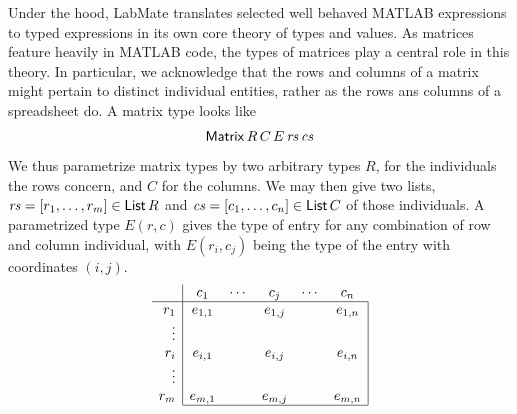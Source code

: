\documentclass{IMEKO2024}
\newcommand{\Matrix}[5]{\mathsf{Matrix}\,#1\,#2\,#3\,#4\,#5}
\newcommand{\List}[1]{\mathsf{List}\,#1}
\newcommand{\param}{parametrize}
\begin{document}
Under the hood, LabMate translates selected well behaved MATLAB expressions
to typed expressions in its own core theory of types and values.
%
As matrices feature heavily in MATLAB code, the types of matrices
play a central role in this theory.
%
In particular, we acknowledge that the rows and columns of a matrix might pertain to distinct individual entities, rather as the rows ans columns of a spreadsheet do.
%
A matrix type looks like
\[\Matrix{R}{C}{E}{\rs}{\cs}
\]
%
We thus \param{} matrix types by two arbitrary types $R$, for the individuals the rows concern, and $C$ for the columns. We may then give two lists, $\rs = [r_1,\ldots,r_m]\in\List{R}$ and $\cs = [c_1,\ldots,c_n]\in\List{C}$ of those individuals. A \param{}d type $E(r,c)$ gives the type of entry for any combination of row and column individual, with $E(r_i,c_j)$ being the type of the entry with coordinates $(i,j)$.
\[\begin{array}{r|ccccc|}
\;     & c_1      & \cdots & c_j     & \cdots & \multicolumn{1}{c}{c_n}     \\
\hline
r_1    & e_{1,1}  &        & e_{1,j} &        & e_{1,n} \\
\vdots &          &        &         &        &         \\
r_i    & e_{i,1}  &        & e_{i,j} &        & e_{i,n} \\
\vdots &          &        &         &        &         \\
r_m    & e_{m,1}  &        & e_{m,j} &        & e_{m,n}  \\
      \cline{2-6}
\end{array}\]
\end{document}
